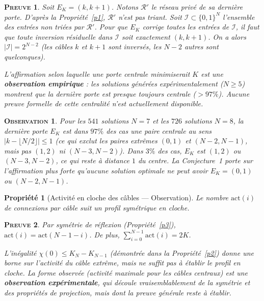 \documentclass[11pt,a4paper]{article}
\theoremstyle{propretheoreme}
\newtheorem{propriete}{Propriété}
\newtheorem*{observation}{\small\textsc{Observation}}
\theoremstyle{proprepreuve}
\newtheorem*{preuve}{\small\textsc{Preuve}}
\theoremstyle{proprecorollaire}
\begin{document}
\begin{preuve}
Soit $E_K = (k,k+1)$. Notons $\mathcal{R}'$ le réseau privé de sa dernière porte. D'après la Propriété~\ref{p1}, $\mathcal{R}'$ n'est pas triant. Soit $\mathcal{I} \subset \{0,1\}^N$ l'ensemble des entrées non triées par $\mathcal{R}'$. Pour que $E_K$ corrige \emph{toutes} les entrées de $\mathcal{I}$, il faut que toute inversion résiduelle dans $\mathcal{I}$ soit exactement $(k,k+1)$. On a alors $|\mathcal{I}| = 2^{N-2}$ (les câbles $k$ et $k+1$ sont inversés, les $N-2$ autres sont quelconques).

L'affirmation selon laquelle une porte centrale minimiserait $K$ est une \textbf{observation empirique} : les solutions générées expérimentalement ($N\ge5$) montrent que la dernière porte est presque toujours centrale ($>97\%$). Aucune preuve formelle de cette centralité n'est actuellement disponible.
\end{preuve}

\begin{observation}
Pour les $541$ solutions $N=7$ et les $726$ solutions $N=8$, la dernière porte $E_K$ est dans $97\%$ des cas une paire centrale au sens $|k - \lfloor N/2\rfloor| \le 1$ (ce qui exclut les paires extrêmes $(0,1)$ et $(N-2,N-1)$, mais pas $(1,2)$ ni $(N-3,N-2)$). Dans $3\%$ des cas, $E_K$ est $(1,2)$ ou $(N-3,N-2)$, ce qui reste à distance $1$ du centre. La Conjecture~1 porte sur l'affirmation plus forte qu'aucune solution optimale ne peut avoir $E_K = (0,1)$ ou $(N-2,N-1)$.
\end{observation}

\begin{propriete}[Activité en cloche des câbles --- Observation]\label{p6}
Le nombre $\text{act}(i)$ de connexions par câble suit un profil symétrique en cloche.
\end{propriete}

\begin{preuve}
Par symétrie de réflexion (Propriété~\ref{p3}), $\text{act}(i) = \text{act}(N-1-i)$. De plus, $\sum_{i=0}^{N-1} \text{act}(i) = 2K$.

L'inégalité $\chi(0) \le K_N - K_{N-1}$ (démontrée dans la Propriété~\ref{p2}) donne une borne sur l'activité du câble extrême, mais ne suffit pas à établir le profil en cloche. La forme observée (activité maximale pour les câbles centraux) est une \textbf{observation expérimentale}, qui découle vraisemblablement de la symétrie et des propriétés de projection, mais dont la preuve générale reste à établir.
\end{preuve}
\end{document}
